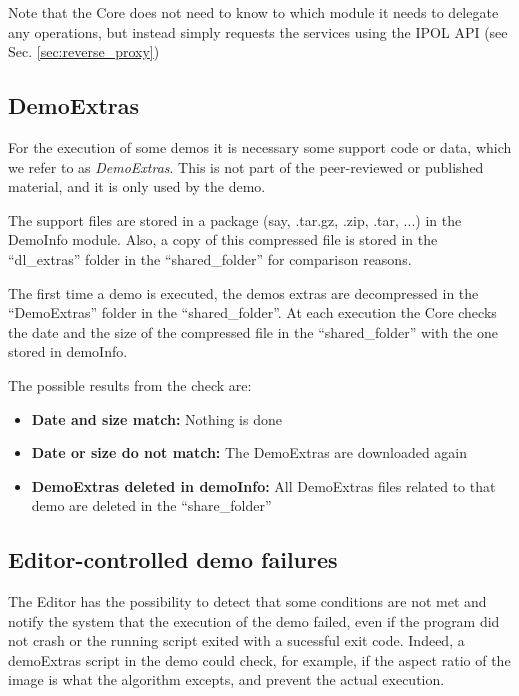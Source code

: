 Note that the Core does not need to know to which module it needs to delegate any operations, but instead simply requests the services using the IPOL API (see Sec. \ref{sec:reverse_proxy})

\subsection{DemoExtras}
\label{demoextras} 
For the execution of some demos it is necessary some support code or data, which we refer to as \emph{DemoExtras}. This is not part of the peer-reviewed or published material, and it is only used by the demo.

The support files are stored in a package (say, .tar.gz, .zip, .tar, ...) in the DemoInfo module. Also, a copy of this compressed file is stored in the ``dl\_extras'' folder in the ``shared\_folder'' for comparison reasons. 

The first time a demo is executed, the demos extras are decompressed in the ``DemoExtras'' folder in the ``shared\_folder''. At each execution the Core checks the date and the size of the compressed file in the ``shared\_folder'' with the one stored in demoInfo. 

The possible results from the check are:
\begin{itemize}
 \item \textbf{Date and size match:} Nothing is done
 \item \textbf{Date or size do not match:} The DemoExtras are downloaded again
 \item \textbf{DemoExtras deleted in demoInfo:} All DemoExtras files related to that demo are deleted in the ``share\_folder''
\end{itemize}

\subsection{Editor-controlled demo failures}
The Editor has the possibility to detect that some conditions are not met and notify the system that the execution of the demo failed, even if the program did not crash or the running script exited with a sucessful exit code. Indeed, a demoExtras script in the demo could check, for example, if the aspect ratio of the image is what the algorithm excepts, and prevent the actual execution.

